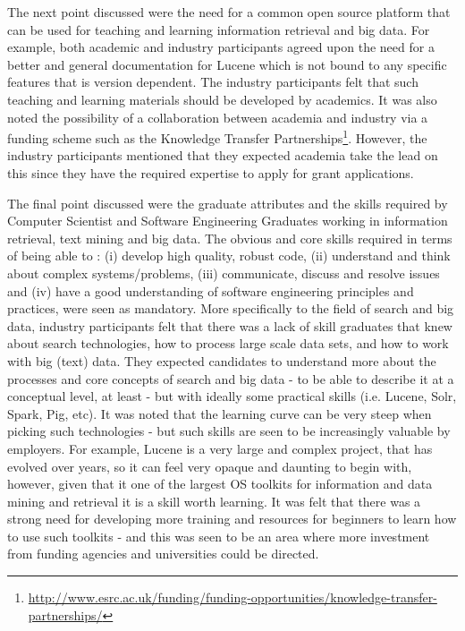 
The next point discussed were the need for a common open source platform that can be used for teaching and learning information retrieval and big data. 
For example, both academic and industry participants agreed upon the need for a better and general documentation for Lucene which is not bound to any specific features that is version dependent. 
The industry participants felt that such teaching and learning materials should be developed by academics. 
It was also noted the possibility of a collaboration between academia and industry via a funding scheme such as the Knowledge Transfer Partnerships\footnote{\scriptsize{\url{http://www.esrc.ac.uk/funding/funding-opportunities/knowledge-transfer-partnerships/}}}. 
However, the industry participants mentioned that they expected academia take the lead on this since they have the required expertise to apply for grant applications. 

The final point discussed were the graduate attributes and the skills required by Computer Scientist and Software Engineering Graduates working in information retrieval, text mining and big data. 
The obvious and core skills required in terms of being able to : (i) develop high quality, robust code, (ii) understand and think about complex systems/problems, (iii) communicate, discuss and resolve issues and (iv) have a good understanding of software engineering principles and practices, were seen as mandatory. 
More specifically to the field of search and big data, industry participants felt that there was a lack of skill graduates that knew about search technologies, how to process large scale data sets, and how to work with big (text) data. 
They expected candidates to understand more about the processes and core concepts of search and big data - to be able to describe it at a conceptual level, at least - but with ideally some practical skills (i.e. Lucene, Solr, Spark, Pig, etc). 
It was noted that the learning curve can be very steep when picking such technologies - but such skills are seen to be increasingly valuable by employers. 
For example, Lucene is a very large and complex project, that has evolved over years, so it can feel very opaque and daunting to begin with, however, given that it one of the largest OS toolkits for information and data mining and retrieval it is a skill worth learning. 
It was felt that there was a strong need for developing more training and resources for beginners to learn how to use such toolkits - and this was seen to be an area where more investment from funding agencies and universities could be directed. 







